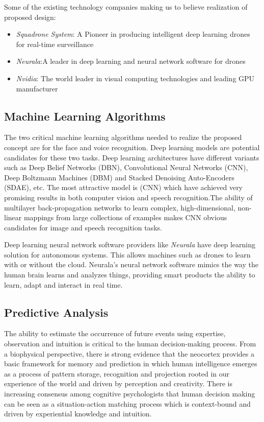 \documentclass[sigconf]{acmart}
\begin{document}
Some of the existing technology companies making us to believe realization of proposed design:
 \begin{itemize}
    \item \textit{Squadrone System}: A Pioneer in producing intelligent deep learning drones for real-time surveillance
    \item \textit{Neurala}:A leader in deep learning and neural network software for drones
    \item \textit{Nvidia}: The world leader in visual computing technologies and leading GPU manufacturer
 \end{itemize}

\subsection{Machine Learning Algorithms}
The two critical machine learning algorithms needed to realize the proposed concept are for the face and voice recognition. Deep learning models are potential candidates for these two tasks. Deep learning architectures have different variants such as Deep Belief Networks (DBN)\cite{Hinton2009}, Convolutional Neural Networks (CNN)\cite{NIPS2012_4824}, Deep Boltzmann Machines (DBM)\cite{pmlr-v9-salakhutdinov10a} and Stacked Denoising Auto-Encoders (SDAE)\cite{Vincent2010}, etc. The most attractive model is (CNN) which have achieved very promising results in both computer vision and speech recognition.The ability of multilayer back-propagation networks to learn complex, high-dimensional, non-linear mappings from large collections of examples makes CNN\cite{LeCun1998} obvious candidates for image and speech recognition tasks. 

Deep learning neural network software providers like \textit{Neurala} have deep learning solution for autonomous systems. This allows machines such as drones to learn with or without the cloud. Neurala's neural network software mimics the way the human brain learns and analyzes things, providing smart products the ability to learn, adapt and interact in real time.

\subsection{Predictive Analysis }
The ability to estimate the occurrence of future events using expertise, observation and intuition is critical to the human decision-making process. From a biophysical perspective, there is strong evidence that the neocortex provides a basic framework for memory and prediction in which human intelligence emerges as a process of pattern storage, recognition and projection rooted in our experience of the world and driven by perception and creativity. There is increasing consensus among cognitive psychologists that human decision making can be seen as a situation-action matching process which is context-bound and driven by experiential knowledge and intuition.
\end{document}
